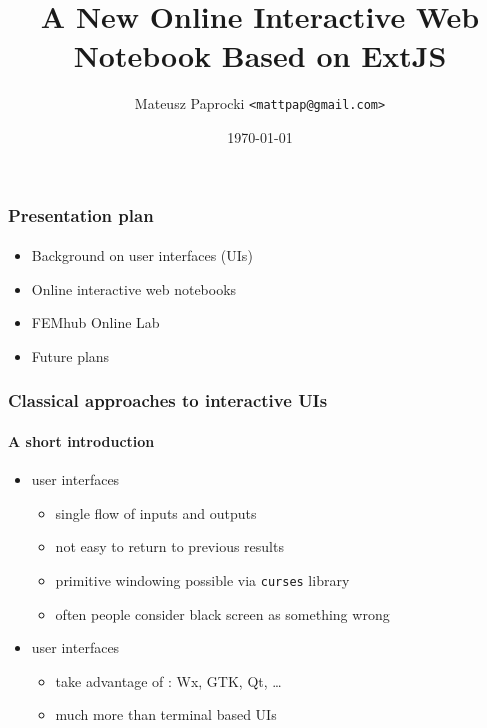 \documentclass{beamer}
\title{A New Online Interactive Web Notebook Based on ExtJS}
\author{Mateusz Paprocki \texttt{<mattpap@gmail.com>}}
\institute[PWR]{Wrocław University of Technology \newline University of Nevada, Reno}
\date{\today}
\begin{document}
\frame{\titlepage}

\begin{frame}
    \frametitle{Presentation plan}
    \framesubtitle{}

    \begin{itemize}
        \item Background on user interfaces (UIs)
        \pause
        \item Online interactive web notebooks
        \pause
        \item FEMhub Online Lab
        \pause
        \item Future plans
    \end{itemize}
\end{frame}

\begin{frame}
    \frametitle{Classical approaches to interactive UIs}
    \framesubtitle{A short introduction}

    \begin{itemize}
        \item {} user interfaces
            \begin{itemize}
                \pause
                \item single flow of inputs and outputs
                \pause
                \item not easy to return to previous results
                \pause
                \item primitive windowing possible via \texttt{curses} library
                \pause
                \item often people consider black screen as something wrong
            \end{itemize}
        \pause
        \item {} user interfaces
            \begin{itemize}
                \pause
                \item take advantage of : Wx, GTK, Qt, \ldots
                \pause
                \item much more  than terminal based UIs
            \end{itemize}
    \end{itemize}
\end{frame}
\end{document}
